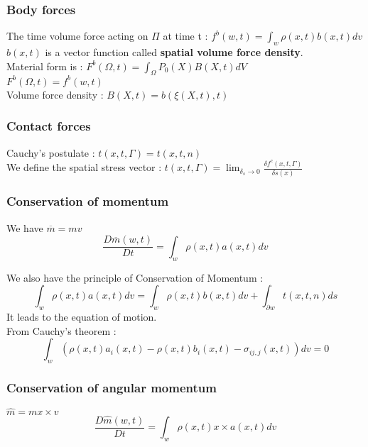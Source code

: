 \documentclass[../main.tex]{subfiles}
\begin{document}
\subsubsection{Body forces}
The time volume force acting on $\Pi$ at time t : $f^b(w,t) = \int_w \rho(x,t) b(x,t)dv$\\
$b(x,t)$ is a vector function called \textbf{spatial volume force density}.\\

Material form is : $F^b(\Omega, t) = \int_\Omega P_0(X)B(X,t)dV$\\
$F^b(\Omega, t)=f^b(w,t)$\\

Volume force density : $B(X,t) = b(\xi(X,t), t)$\\

\subsubsection{Contact forces}
Cauchy's postulate : $t(x,t,\Gamma) = t(x,t,n)$\\

We define the spatial stress vector : $t(x,t,\Gamma) = \lim_{\delta_s \rightarrow 0} \frac{\delta f^c(x,t,\Gamma)}{\delta s(x)}$

\subsubsection{Conservation of momentum}

We have $\overline{m} = mv$\\
\begin{equation}
    \frac{D\overline{m}(w,t)}{Dt} = \int_w \rho(x,t) a(x,t) dv
\end{equation}

We also have the principle of Conservation of Momentum : \begin{equation}
    \int_w \rho(x,t) a(x,t)dv = \int_w \rho(x,t) b(x,t) dv + \int_{\partial w} t(x,t,n)ds
\end{equation}
It leads to the equation of motion.\\

From Cauchy's theorem : \begin{equation}
    \int_w (\rho(x,t) a_i(x,t)-\rho(x,t) b_i(x,t) - \sigma_{ij,j}(x,t))dv = 0
\end{equation}



\subsubsection{Conservation of angular momentum}
$\hat{m} = mx\times v$\\
\begin{equation}
    \frac{D\hat{m}(w,t)}{Dt} = \int_w \rho(x,t)x\times a(x,t)dv
\end{equation}
\end{document}
